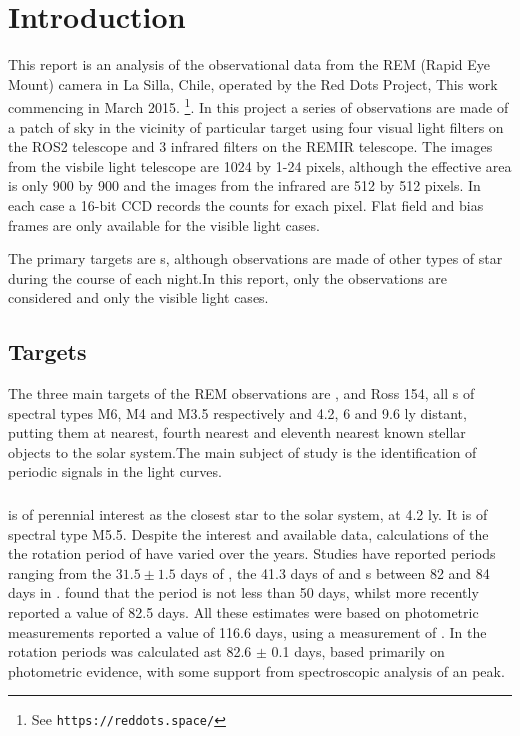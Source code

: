 \section{Introduction}
\protect\label{section:intro}

\engdate

This report is an analysis of the observational data from the REM (Rapid Eye
Mount) camera in La Silla, Chile, operated by the Red Dots Project, This work
commencing in March 2015. \footnote{See \texttt{https://reddots.space/}}. In
this project a series of observations are made of a patch of sky in the vicinity of particular target using four visual
light filters on the ROS2 telescope and 3 infrared filters on the REMIR
telescope. The images from the visbile light telescope are 1024 by 1-24 pixels, although
the effective area is only 900 by 900 and the images from the infrared are 512
by 512 pixels. In each case a 16-bit CCD records the counts for exach pixel.
Flat field and bias frames are only available for the visible light cases.

The primary targets are \rdwarf s, although observations are made of other types
of star during the course of each night.In this report, only the {\rdwarf} observations are considered and only the
visible light cases.

\subsection{Targets}

The three main targets of the REM observations are \prox, {\bstar} and Ross 154,
all \rdwarf s of spectral types M6, M4 and M3.5 respectively and 4.2, 6 and 9.6
ly distant, putting them at nearest, fourth nearest and eleventh nearest known
stellar objects to the solar system.The main subject of study is the
identification of periodic signals in the light curves.

\subsubsection{\prox}
{\prox} is of perennial interest as the closest star to the solar system, at 4.2 ly. It is of spectral type M5.5.
Despite the interest and available data, calculations of the the rotation period
of {\prox} have varied over the years.  Studies have reported periods
ranging from the $ 31.5 \pm 1.5 $ days of \citet{guinan96}, the 41.3 days of \citet{benedict93}
and s between 82 and 84 days in \citealt{benedict92,benedict98}.  \citet{kurster99} found that the period is not less
than 50 days, whilst more recently \citet{kiraga07} reported a value of 82.5
days. All these estimates were based on photometric measurements \citet[Table 3]{suarezmascareno15} reported a value of 116.6 days, using a
measurement of {\ha}. In \citet{collins17} the rotation periods was calculated
ast 82.6 $\pm$ 0.1 days, based primarily on photometric evidence, with some
support from spectroscopic analysis of an {\ha} peak.

